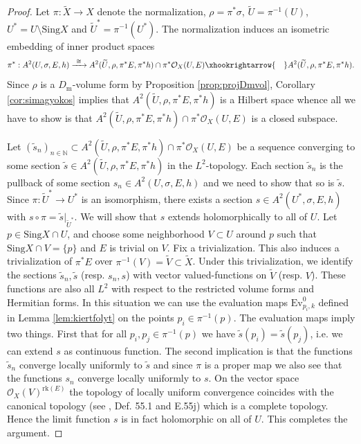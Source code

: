 \documentclass[11pt]{amsart}
\theoremstyle{definition}
\begin{document}
\begin{proof}
    Let $\pi: \widetilde{X}\to X$ denote the normalization, $\rho = \pi^*\sigma$, $\widetilde{U} = \pi^{-1}(U)$, $U^* = U\setminus \text{Sing}X$ and $\widetilde{U}^* = \pi^{-1}(U^*)$. The normalization induces an isometric embedding of inner product spaces
    $$\pi^* : A^2(U,\sigma,E,h) \xrightarrow{ \ \cong \ } A^2(\widetilde{U},\rho, \pi^*E,\pi^*h) \cap \pi^*\mathcal{O}_X(U,E) \xhookrightarrow{ \ \ \ } A^2(\widetilde{U},\rho, \pi^*E,\pi^*h).$$
    Since $\rho$ is a $D_\text{m}$-volume form by Proposition \ref{prop:projDmvol}, Corollary \ref{cor:simagyokos} implies that $A^2(\widetilde{U},\rho, \pi^*E,\pi^*h)$ is a Hilbert space whence all we have to show is that $A^2(\widetilde{U},\rho, \pi^*E,\pi^*h) \cap \pi^*\mathcal{O}_X(U,E)$ is a closed subspace.

    Let $(\tilde{s}_n)_{n\in\mathbb{N}} \subset A^2(\widetilde{U},\rho, \pi^*E,\pi^*h) \cap \pi^*\mathcal{O}_X(U,E)$ be a sequence converging to some section $\tilde{s} \in A^2(\widetilde{U},\rho, \pi^*E,\pi^*h)$ in the $L^2$-topology. Each section $\tilde{s}_n$ is the pullback of some section $s_n \in A^2(U,\sigma,E,h)$ and we need to show that so is $\tilde{s}$. Since $\pi : \widetilde{U}^* \to U^*$ is an isomorphism, there exists a section $s \in A^2(U^*,\sigma,E,h)$ with $s\circ \pi = \tilde{s}\big|_{\widetilde{U}^*}$. We will show that $s$ extends holomorphically to all of $U$.
    Let $p\in \text{Sing}X\cap U$, and choose some neighborhood $V\subset U$ around $p$ such that $\text{Sing}X\cap V=\{p\}$ and $E$ is trivial on $V$. Fix a trivialization. This also induces a trivialization of $\pi^*E$ over $\pi^{-1}(V)=\widetilde{V}\subset  \widetilde{X}$. Under this trivialization, we identify the sections $\tilde{s}_n, \tilde{s}$ (resp. $s_n,s$) with vector valued-functions on $\widetilde{V}$ (resp. $V$). These functions are also all $L^2$ with respect to the restricted volume forms and Hermitian forms. In this situation we can use the evaluation maps $\text{Ev}_{p_i,k}^0$ defined in Lemma \ref{lem:kiertfolyt} on the points $p_i\in \pi^{-1}(p)$. The evaluation maps imply two things. First that for all $p_i,p_j\in \pi^{-1}(p)$ we have $\tilde{s}(p_i)=\tilde{s}(p_j)$, i.e. we can extend $s$ as continuous function. The second implication is that the functions $\tilde{s}_n$ converge locally uniformly to $\tilde{s}$ and since $\pi$ is a proper map we also see that the functions $s_n$ converge locally uniformly to $s$.
    On the vector space $\mathcal{O}_X(V)^{\text{rk}(E)}$ the topology of locally uniform convergence coincides with the canonical topology (see \cite{kaupkaup}, Def. 55.1 and E.55j) which is a complete topology. Hence the limit function $s$ is in fact holomorphic on all of $U$. This completes the argument.
\end{proof}
\end{document}
